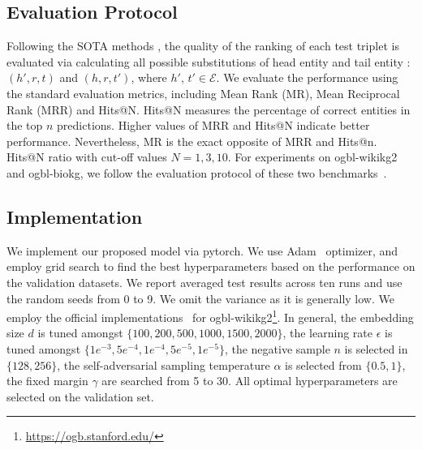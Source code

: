 \documentclass[10pt, a4paper]{article}
\begin{document}
\subsection{Evaluation Protocol}

Following the SOTA methods \cite{31sun2019rotate,52chao2020pairre}, the quality of the ranking of each test triplet is evaluated via calculating all possible substitutions of head entity and tail entity : $(h',r,t)$ and $(h,r,t')$, where $h'$, $t'\in \mathcal{E}$. We evaluate the performance using the standard evaluation metrics, including Mean Rank (MR), Mean Reciprocal Rank (MRR) and Hits@N. Hits@N measures the percentage of correct entities in the top $n$ predictions. Higher values of MRR and Hits@N indicate better performance. Nevertheless, MR is the exact opposite of MRR and Hits@n. Hits@N ratio with cut-off values $N = 1, 3, 10$. For experiments on ogbl-wikikg2 and ogbl-biokg, we follow the evaluation protocol of these two benchmarks~\cite{hu2020open}.


\subsection{Implementation} 
We implement our proposed model via pytorch. We use Adam~\cite{adam} optimizer, and employ grid search to find the best hyperparameters based on the performance on the validation datasets. We report averaged test results across ten runs and use the random seeds from 0 to 9. We omit the variance as it is generally low.  We employ the official implementations~\cite{hu2020open} for ogbl-wikikg2\footnote{\url{https://ogb.stanford.edu/}}. In general, the embedding size $d$ is tuned amongst $\{100,200,500,1000,1500,2000\}$, the learning rate $\epsilon $ is tuned amongst $\{1e^{-3},5e^{-4},1e^{-4},5e^{-5},1e^{-5}\}$, the negative sample $n$ is selected in $\{128,256\}$, the self-adversarial sampling temperature $\alpha$ is selected from $\{0.5,1\}$, the fixed margin $\gamma$ are searched from 5 to 30.  All optimal hyperparameters are selected on the validation set.
\end{document}
